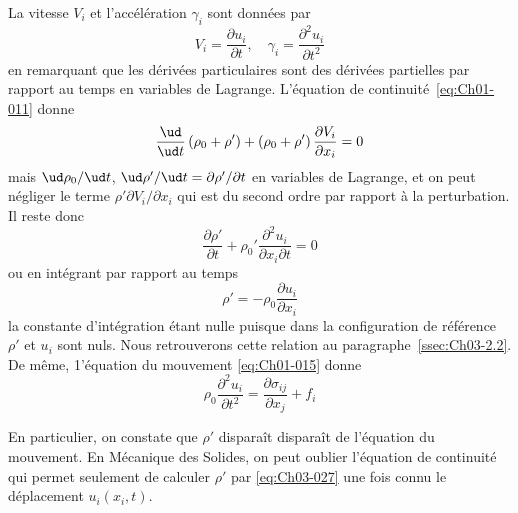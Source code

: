 \begin{enumerate}
        La vitesse $V_i$ et l'accélération $\gamma_i$ sont données par
        \begin{equation}
            V_i = \frac{\partial u_i}{\partial t}, \quad \gamma_i = \frac{\partial^2 u_i}{\partial t^2}
            \label{eq:Ch03-026}
        \end{equation}
        en remarquant que les dérivées particulaires sont des dérivées partielles par rapport au temps en variables de Lagrange.
        L'équation de continuité~\eqref{eq:Ch01-011} donne
        \begin{equation*}
            \frac{\ud}{\ud t} \left( \rho_0 +\rho' \right) + \left( \rho_0 + \rho' \right) \frac{\partial V_i}{\partial x_i} = 0
        \end{equation*}
        mais  $\ud \rho_0 / \ud t$, $\ud \rho' / \ud t = \partial \rho' / \partial t$ en variables de Lagrange, et on peut négliger le  terme $\rho' \partial V_i / \partial x_i$ qui est du second ordre par rapport à la perturbation.
        Il  reste  donc
        \begin{equation*}
            \frac{\partial \rho'}{\partial t} + \rho_0' \frac{\partial^2 u_i}{\partial x_i \partial t} = 0
        \end{equation*}
        ou en intégrant par rapport au temps
        \begin{equation}
            \rho' = - \rho_0 \frac{\partial u_i}{\partial x_i}
            \label{eq:Ch03-027}
        \end{equation}
        la constante d'intégration étant nulle puisque dans la configuration de référence $\rho'$ et $u_i$ sont nuls.
        Nous retrouverons cette relation au paragraphe~\ref{ssec:Ch03-2.2}.
        De même, 1'équation du mouvement \eqref{eq:Ch01-015} donne
        \begin{equation}
            \rho_0 \frac{\partial^2 u_i}{\partial t^2} = \frac{\partial \sigma_{ij}}{\partial x_j} + f_i
            \label{eq:Ch03-028}
        \end{equation}
\end{enumerate}
En particulier,  on constate que $\rho'$ disparaît disparaît de l'équation du mouvement.
En Mécanique des Solides, on peut oublier l'équation de continuité qui permet seulement de calculer $\rho'$ par \eqref{eq:Ch03-027} une fois connu le déplacement $u_i \left( x_i, t \right)$.
